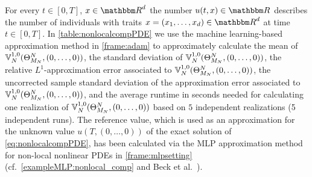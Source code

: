 For every $t\in[0,T]$, $x\in\R^d$ the number $u(t,x) \in \R$ describes the number of individuals with traits $x = (x_1, \dots, x_d) \in \R^d$ at time $t \in [0,T]$.
In \cref{table:nonlocalcompPDE}
we use the machine learning-based approximation method
in \cref{frame:adam}
to approximately calculate
the mean of %
$
{\mathbb{V}}^{1,0}_N(\Theta^N_{M_N},(0,\ldots,0))
$,
the standard deviation of %
$
{\mathbb{V}}^{1,0}_N(\Theta^N_{M_N},(0,\ldots,0))
$,
the relative $ L^1 $-approximation error associated to %
$
{\mathbb{V}}^{1,0}_N(\Theta^N_{M_N},(0,\ldots,0))
$,
the uncorrected sample standard deviation of the approximation error associated to %
$
{\mathbb{V}}^{1,0}_N(\Theta^N_{M_N},(0,\ldots,0))
$,
and the average runtime in seconds needed for calculating one realization of $
{\mathbb{V}}^{1,0}_N(\Theta^N_{M_N},(0,\ldots,0))
$
%
based on $5$ independent realizations (5 independent runs).
%
The reference value, which is used as an approximation for the unknown value $u(T,(0,\ldots,0))$ of the exact solution of \eqref{eq:nonlocalcompPDE},  has been calculated via the MLP approximation method for non-local nonlinear PDEs in \cref{frame:mlpsetting} (cf.~\cref{exampleMLP:nonlocal_comp} and Beck et al.~\citep[Remark~3.3]{Beck2017a}).


